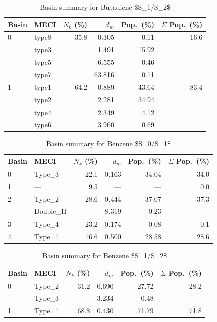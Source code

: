\begin{table}[htbp]
\centering
\caption{Basin summary for Butadiene \$S_1/S_2\$}
\begin{tabular}{llrrrr}
\hline
Basin & MECI & $N_k$ (\%) & $d_m$ & Pop.\ (\%) & $\Sigma$ Pop.\ (\%) \\
\hline
0 & type8 & 35.8 & 0.305 & 0.11 & 16.6 \\
 & type3 &  & 1.491 & 15.92 &  \\
 & type5 &  & 6.555 & 0.46 &  \\
 & type7 &  & 63.816 & 0.11 &  \\
\hline
1 & type1 & 64.2 & 0.889 & 43.64 & 83.4 \\
 & type2 &  & 2.281 & 34.94 &  \\
 & type4 &  & 2.349 & 4.12 &  \\
 & type6 &  & 3.960 & 0.69 &  \\
\hline
\end{tabular}
\end{table}

\begin{table}[htbp]
\centering
\caption{Basin summary for Benzene \$S_0/S_1\$}
\begin{tabular}{llrrrr}
\hline
Basin & MECI & $N_k$ (\%) & $d_m$ & Pop.\ (\%) & $\Sigma$ Pop.\ (\%) \\
\hline
0 & Type_3 & 22.1 & 0.163 & 34.04 & 34.0 \\
\hline
1 & — & 9.5 & — & — & 0.0 \\
\hline
2 & Type_2 & 28.6 & 0.444 & 37.07 & 37.3 \\
 & Double_H &  & 8.319 & 0.23 &  \\
\hline
3 & Type_4 & 23.2 & 0.174 & 0.08 & 0.1 \\
\hline
4 & Type_1 & 16.6 & 0.500 & 28.58 & 28.6 \\
\hline
\end{tabular}
\end{table}

\begin{table}[htbp]
\centering
\caption{Basin summary for Benzene \$S_1/S_2\$}
\begin{tabular}{llrrrr}
\hline
Basin & MECI & $N_k$ (\%) & $d_m$ & Pop.\ (\%) & $\Sigma$ Pop.\ (\%) \\
\hline
0 & Type_2 & 31.2 & 0.690 & 27.72 & 28.2 \\
 & Type_3 &  & 3.234 & 0.48 &  \\
\hline
1 & Type_1 & 68.8 & 0.430 & 71.79 & 71.8 \\
\hline
\end{tabular}
\end{table}
